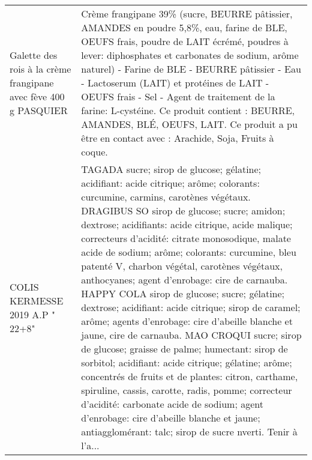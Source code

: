 \begin{longtable}{p{5cm}p{10cm}}
                                          Galette des rois à la crème frangipane avec fève 400 g PASQUIER &                                                                                                                                                                                                                                                                                                                                                                                                                                                                                                                                           Crème frangipane 39\% (sucre, BEURRE pâtissier, AMANDES en poudre 5,8\%, eau, farine de BLE, OEUFS frais, poudre de LAIT  écrémé, poudres à lever: diphosphates et carbonates de sodium, arôme naturel) - Farine de BLE - BEURRE pâtissier - Eau - Lactoserum (LAIT) et  protéines de LAIT - OEUFS frais - Sel - Agent de traitement de la farine: L-cystéine.  Ce produit contient : BEURRE, AMANDES, BLÉ, OEUFS, LAIT.  Ce produit a pu être en contact avec : Arachide, Soja, Fruits à coque. \\
                                                                         COLIS KERMESSE 2019  A.P " 22+8" &  TAGADA  sucre; sirop de glucose; gélatine; acidifiant: acide citrique; arôme; colorants: curcumine, carmins, carotènes végétaux.  DRAGIBUS SO  sirop de glucose; sucre; amidon; dextrose; acidifiants: acide citrique, acide malique; correcteurs d'acidité: citrate monosodique, malate acide de sodium; arôme; colorants: curcumine, bleu patenté V, charbon végétal, carotènes végétaux, anthocyanes; agent d'enrobage: cire de carnauba.  HAPPY COLA  sirop de glucose; sucre; gélatine; dextrose; acidifiant: acide citrique; sirop de caramel; arôme; agents d'enrobage: cire d'abeille blanche et jaune, cire de carnauba.  MAO CROQUI  sucre; sirop de glucose; graisse de palme; humectant: sirop de sorbitol; acidifiant: acide citrique; gélatine; arôme; concentrés de fruits et de plantes: citron, carthame, spiruline, cassis, carotte, radis, pomme; correcteur d'acidité: carbonate acide de sodium; agent d'enrobage: cire d'abeille blanche et jaune; antiagglomérant: talc; sirop de sucre  nverti. Tenir à  l'a... \\

\end{longtable}
